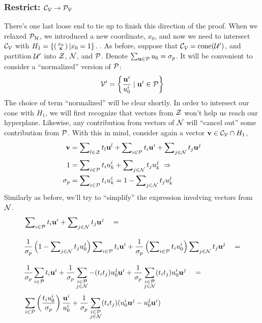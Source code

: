 \subsubsection{Restrict: $\CV \to \PV$}
There's one last loose end to tie up to finish this direction of the proof.  When we relaxed $\PH$, we introduced a new coordinate, $x_0$, and now we need to intersect $\CV$ with $H_1 = \{\smallstack{x_0}{\x} | x_0 = 1\}$.  .  As before, suppose that $\CV = \cone(\U')$, and partition $\U'$ into $\Z$, $\N$, and $\P$.  Denote $\sum_{\u \in \P}u_0 = \sigma_p$.  It will be convenient to consider a ``normalized'' version of $\P$:
  \[ \V' = \left\{\frac{\u^i}{u^i_0} \suchthat \u^i \in \P\right\} \]
The choice of term ``normalized'' will be clear shortly.  In order to intersect our cone with $H_1$, we will first recognize that vectors from $\Z$ won't help us reach our hyperplane.  Likewise, any contribution from vectors of $\N$ will ``cancel out'' some contribution from $\P$.  With this in mind, consider again a vector $\v \in \CV \cap H_1$,
  \begin{align*}
  \v &= \setsum{t}{l}{\Z} +
        \setsum{t}{i}{\P} +
        \setsum{t}{j}{\N} \\[3pt]
   1 &= \setsumk{t}{i}{\P} + \setsumk{t}{j}{\N} \;\Rightarrow \\
   \sigma_p &= \setsumk{t}{i}{\P} = 1 - \setsumk{t}{j}{\N} \\
  \end{align*}
Similarly as before, we'll try to ``simplify'' the expression involving vectors from $\N$.
\begin{align*}
  & \setsum{t}{i}{\P} + \setsum{t}{j}{\N} \quad= \\[1em]
  & \frac{1}{\sigma_p}\left(1 - \setsumo{t}{j}{\N}\right)\setsum{t}{i}{\P} + 
      \frac{1}{\sigma_p}\left(\setsumo{t}{i}{\P}\right)\setsum{t}{j}{\N} \quad= \\[1em]
  & \frac{1}{\sigma_p}\sum_{i\in\P}t_i \u^i + 
      \frac{1}{\sigma_p}\sum_{\substack{i\in\P\\j\in\N}} -(t_i t_j)u^j_0\u^i + 
      \frac{1}{\sigma_p}\sum_{\substack{i\in\P\\j\in\N}} (t_i t_j)u^i_0\u^j \quad= \\[3pt]
  & \sum_{i\in\P}\left(\frac{t_i u^i_0}{\sigma_p}\right) \frac{\u^i}{u^i_0} + 
      \frac{1}{\sigma_p}\sum_{\substack{i\in\P\\j\in\N}} (t_i t_j) (u^i_0\u^j - u^j_0\u^i)
\end{align*}
